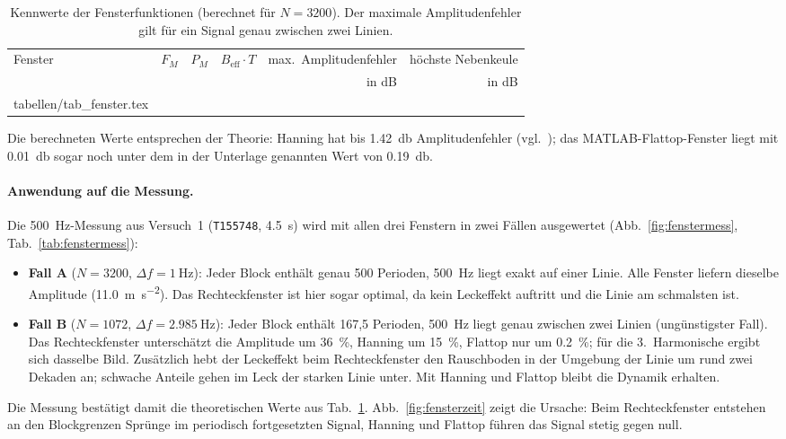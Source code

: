 \documentclass[a4paper,11pt,parskip=half,toc=listof,bibliography=totoc]{scrartcl}
\makeatletter
\newcommand{\tabinput}[1]{\@@input tabellen/#1.tex }
\newcommand{\abb}[1]{Abb.~\ref{#1}}
\newcommand{\tab}[1]{Tab.~\ref{#1}}
\makeatother
\begin{document}
\begin{table}[H]
  \centering
  \caption{Kennwerte der Fensterfunktionen (berechnet für $N=3200$). Der
  maximale Amplitudenfehler gilt für ein Signal genau zwischen zwei Linien.}
  \label{tab:fenster}
  \begin{tabular}{lrrrrr}
    \toprule
    Fenster & $F_M$ & $P_M$ & $B_\text{eff}\cdot T$ & max.\ Amplitudenfehler & höchste Nebenkeule \\
            &       &       &                       & in dB                   & in dB \\
    \midrule
    \tabinput{tab_fenster}
    \bottomrule
  \end{tabular}
\end{table}

Die berechneten Werte entsprechen der Theorie: Hanning hat bis
\SI{1.42}{\decibel} Amplitudenfehler (vgl.\ \cite{esefeld}); das
MATLAB-Flattop-Fenster liegt mit \SI{0.01}{\decibel} sogar noch unter dem in
der Unterlage genannten Wert von \SI{0.19}{\decibel}.

\paragraph{Anwendung auf die Messung.} Die \SI{500}{\hertz}-Messung aus
Versuch~1 (\texttt{T155748}, \SI{4.5}{\second}) wird mit allen drei Fenstern
in zwei Fällen ausgewertet (\abb{fig:fenstermess}, \tab{tab:fenstermess}):
\begin{itemize}
  \item \textbf{Fall A} ($N=3200$, $\Delta f=\SI{1}{\hertz}$): Jeder Block
        enthält genau 500 Perioden, \SI{500}{\hertz} liegt exakt auf einer
        Linie. Alle Fenster liefern dieselbe Amplitude
        (\SI{11.0}{\metre\per\second\squared}). Das Rechteckfenster ist hier
        sogar optimal, da kein Leckeffekt auftritt und die Linie am
        schmalsten ist.
  \item \textbf{Fall B} ($N=1072$, $\Delta f=\SI{2.985}{\hertz}$): Jeder Block
        enthält 167,5 Perioden, \SI{500}{\hertz} liegt genau zwischen zwei
        Linien (ungünstigster Fall). Das Rechteckfenster unterschätzt die
        Amplitude um \SI{36}{\percent}, Hanning um \SI{15}{\percent}, Flattop
        nur um \SI{0.2}{\percent}; für die 3.~Harmonische ergibt sich
        dasselbe Bild. Zusätzlich hebt der Leckeffekt beim Rechteckfenster
        den Rauschboden in der Umgebung der Linie um rund zwei Dekaden an;
        schwache Anteile gehen im Leck der starken Linie unter. Mit Hanning
        und Flattop bleibt die Dynamik erhalten.
\end{itemize}
Die Messung bestätigt damit die theoretischen Werte aus \tab{tab:fenster}.
\abb{fig:fensterzeit} zeigt die Ursache: Beim Rechteckfenster entstehen an
den Blockgrenzen Sprünge im periodisch fortgesetzten Signal, Hanning und
Flattop führen das Signal stetig gegen null.
\end{document}
